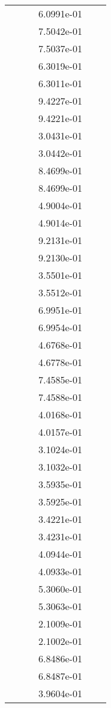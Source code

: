 \begin{xltabular}{\textwidth}{r|rS[table-format=1.3e+2]S[table-format=1.4e+2]S[table-format=1.4e+2]S[table-format=-1.5]}
&  &  & 6.0991e-01 & & \\
&  &  & 7.5042e-01 & & \\
&  &  & 7.5037e-01 & & \\
&  &  & 6.3019e-01 & & \\
&  &  & 6.3011e-01 & & \\
&  &  & 9.4227e-01 & & \\
&  &  & 9.4221e-01 & & \\
&  &  & 3.0431e-01 & & \\
&  &  & 3.0442e-01 & & \\
&  &  & 8.4699e-01 & & \\
&  &  & 8.4699e-01 & & \\
&  &  & 4.9004e-01 & & \\
&  &  & 4.9014e-01 & & \\
&  &  & 9.2131e-01 & & \\
&  &  & 9.2130e-01 & & \\
&  &  & 3.5501e-01 & & \\
&  &  & 3.5512e-01 & & \\
&  &  & 6.9951e-01 & & \\
&  &  & 6.9954e-01 & & \\
&  &  & 4.6768e-01 & & \\
&  &  & 4.6778e-01 & & \\
&  &  & 7.4585e-01 & & \\
&  &  & 7.4588e-01 & & \\
&  &  & 4.0168e-01 & & \\
&  &  & 4.0157e-01 & & \\
&  &  & 3.1024e-01 & & \\
&  &  & 3.1032e-01 & & \\
&  &  & 3.5935e-01 & & \\
&  &  & 3.5925e-01 & & \\
&  &  & 3.4221e-01 & & \\
&  &  & 3.4231e-01 & & \\
&  &  & 4.0944e-01 & & \\
&  &  & 4.0933e-01 & & \\
&  &  & 5.3060e-01 & & \\
&  &  & 5.3063e-01 & & \\
&  &  & 2.1009e-01 & & \\
&  &  & 2.1002e-01 & & \\
&  &  & 6.8486e-01 & & \\
&  &  & 6.8487e-01 & & \\
&  &  & 3.9604e-01 & & \\

\end{xltabular}
